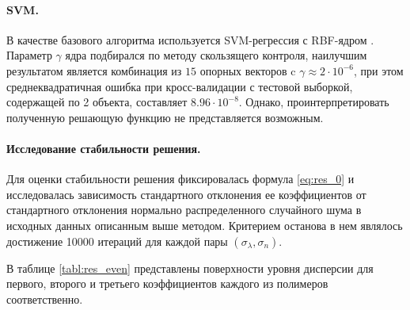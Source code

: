 \documentclass[11pt,a4paper]{article}
\theoremstyle{definition}
\begin{document}
\paragraph{SVM.}

В качестве базового алгоритма используется SVM-регрессия с RBF-ядром \cite{Vapnik79}.
Параметр $\gamma$ ядра подбирался по методу скользящего контроля, наилучшим результатом является
комбинация из $15$ опорных векторов c $\gamma \approx 2 \cdot 10^{-6}$, при этом
среднеквадратичная ошибка при кросс-валидации с тестовой выборкой, содержащей по 2
объекта, составляет $8.96 \cdot 10^{-8}$. Однако, проинтерпретировать полученную
решающую функцию не представляется возможным.

\paragraph{Исследование стабильности решения.}

Для оценки стабильности решения фиксировалась формула \eqref{eq:res_0} и исследовалась
зависимость стандартного отклонения ее коэффициентов от стандартного отклонения
нормально распределенного случайного шума в исходных данных описанным выше методом.
Критерием останова в нем являлось достижение 10000 итераций для каждой пары
$(\sigma_{\lambda}, \sigma_n)$.

В таблице \ref{tabl:res_even} представлены
поверхности уровня дисперсии для первого, второго и третьего коэффициентов каждого из полимеров
соответственно.
\end{document}
